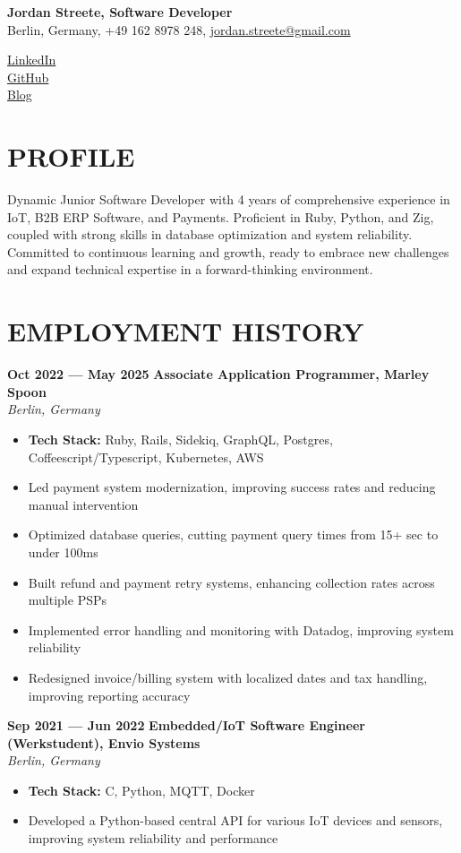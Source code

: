 \documentclass[11pt,a4paper]{article}
\newcommand{\resumesection}[1]{
  \section*{\textcolor{sectioncolor}{\MakeUppercase{#1}}}
}
\newcommand{\job}[4]{
  \textbf{#1 — #2} \hfill \textbf{#3} \\
  \textit{#4}
}
\begin{document}
\begin{minipage}[t]{0.6\textwidth}
{\LARGE\textbf{Jordan Streete, Software Developer}}\\
Berlin, Germany, +49 162 8978 248, \href{mailto:jordan.streete+work-apps-2025@gmail.com}{jordan.streete@gmail.com}
\end{minipage}
\hfill
\begin{minipage}[t]{0.35\textwidth}
\raggedleft
\href{https://www.linkedin.com/in/jordan-streete-0b8b3711a/}{LinkedIn}\\
\href{https://github.com/BoundlessCarrot}{GitHub}\\
\href{https://jstr.dev}{Blog}
\end{minipage}

\resumesection{Profile}
Dynamic Junior Software Developer with 4 years of comprehensive experience in IoT, B2B ERP Software, and Payments. Proficient in Ruby, Python, and Zig, coupled with strong skills in database optimization and system reliability. Committed to continuous learning and growth, ready to embrace new challenges and expand technical expertise in a forward-thinking environment.

\resumesection{Employment \hspace{0.1em} History}

\job{Oct 2022} {May 2025} {Associate Application Programmer, Marley Spoon} {Berlin, Germany}
\begin{itemize}[leftmargin=*,label=$\bullet$,itemsep=0.3ex]
    \item \textbf{Tech Stack:} Ruby, Rails, Sidekiq, GraphQL, Postgres, Coffeescript/Typescript, Kubernetes, AWS
    \item Led payment system modernization, improving success rates and reducing manual intervention
    \item Optimized database queries, cutting payment query times from 15+ sec to under 100ms
    \item Built refund and payment retry systems, enhancing collection rates across multiple PSPs
    \item Implemented error handling and monitoring with Datadog, improving system reliability
    \item Redesigned invoice/billing system with localized dates and tax handling, improving reporting accuracy
\end{itemize}
  
\job{Sep 2021} {Jun 2022} {Embedded/IoT Software Engineer (Werkstudent), Envio Systems} {Berlin, Germany}
\begin{itemize}[leftmargin=*,label=$\bullet$,itemsep=0.3ex]
    \item \textbf{Tech Stack:} C, Python, MQTT, Docker
    \item Developed a Python-based central API for various IoT devices and sensors, improving system reliability and performance
\end{itemize}
\end{document}
